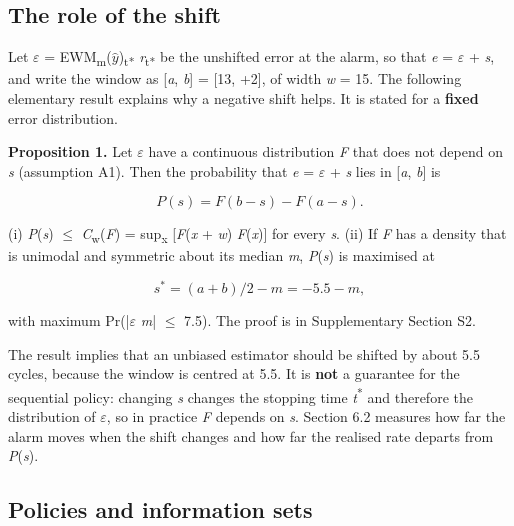 \documentclass[a4paper,fleqn,doubleblind]{cas-dc}
\begin{document}
\subsection{The role of the shift}

Let $\varepsilon$ = EWM\textsubscript{m}($\hat{y}$)\textsubscript{t*} \textminus{} \textit{r}\textsubscript{t*} be the unshifted error at the alarm, so that \textit{e} = $\varepsilon$ + \textit{s}, and write the window as [\textit{a}, \textit{b}] = [\textminus{}13, +2], of width \textit{w} = 15. The following elementary result explains why a negative shift helps. It is stated for a \textbf{fixed} error distribution.

\textbf{Proposition 1.} Let $\varepsilon$ have a continuous distribution \textit{F} that does not depend on \textit{s} (assumption A1). Then the probability that \textit{e} = $\varepsilon$ + \textit{s} lies in [\textit{a}, \textit{b}] is

\begin{equation}
P(s) = F(b - s) - F(a - s).
\end{equation}

(i) \textit{P}(\textit{s}) $\le$ \textit{C}\textsubscript{w}(\textit{F}) = sup\textsubscript{x} [\textit{F}(\textit{x} + \textit{w}) \textminus{} \textit{F}(\textit{x})] for every \textit{s}. (ii) If \textit{F} has a density that is unimodal and symmetric about its median \textit{m}, \textit{P}(\textit{s}) is maximised at

\begin{equation}
s^{*} = (a + b)/2 - m = -5.5 - m,
\end{equation}

with maximum Pr(|$\varepsilon$ \textminus{} \textit{m}| $\le$ 7.5). The proof is in Supplementary Section S2.

The result implies that an unbiased estimator should be shifted by about \textminus{}5.5 cycles, because the window is centred at \textminus{}5.5. It is \textbf{not} a guarantee for the sequential policy: changing \textit{s} changes the stopping time \textit{t}\textsuperscript{*} and therefore the distribution of $\varepsilon$, so in practice \textit{F} depends on \textit{s}. Section 6.2 measures how far the alarm moves when the shift changes and how far the realised rate departs from \textit{P}(\textit{s}).

\subsection{Policies and information sets}
\end{document}
